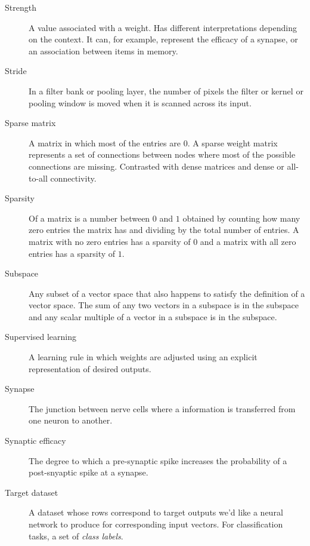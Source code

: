 \begin{description}

\item[Strength] A value associated with a weight. Has different interpretations depending on the context. It can, for example, represent the efficacy of a synapse, or an association between items in memory.

\item[Stride] In a filter bank or pooling layer, the number of pixels the filter or kernel or pooling window is moved when it is scanned across its input.


\item[Sparse matrix] A matrix in which most of the entries are 0. A sparse weight matrix represents a set of connections between nodes where most of the possible connections are missing. Contrasted with dense matrices and dense or all-to-all connectivity. 

\item[Sparsity] Of a matrix is a number between $0$ and $1$ obtained by counting how many zero entries the matrix has and dividing by the total number of entries. A matrix with no zero entries has a sparsity of $0$ and a matrix with all zero entries has a sparsity of $1$.

\item[Subspace] Any subset of a vector space that also happens to satisfy the definition of a vector space. The sum of any two vectors in a subspace is in the subspace and any scalar multiple of a vector in a subspace is in the subspace.

\item[Supervised learning] A learning rule in which weights are adjusted using an explicit representation of desired outputs.


\item[Synapse] The junction between nerve cells where a information is transferred from one neuron to another.

\item[Synaptic efficacy] The degree to which a pre-synaptic spike increases the probability of a post-snyaptic spike at a synapse.

\item[Target dataset] A dataset whose rows correspond to target outputs we'd like a neural network to produce for corresponding input vectors. For classification tasks, a set of \emph{class labels}.


\end{description}

